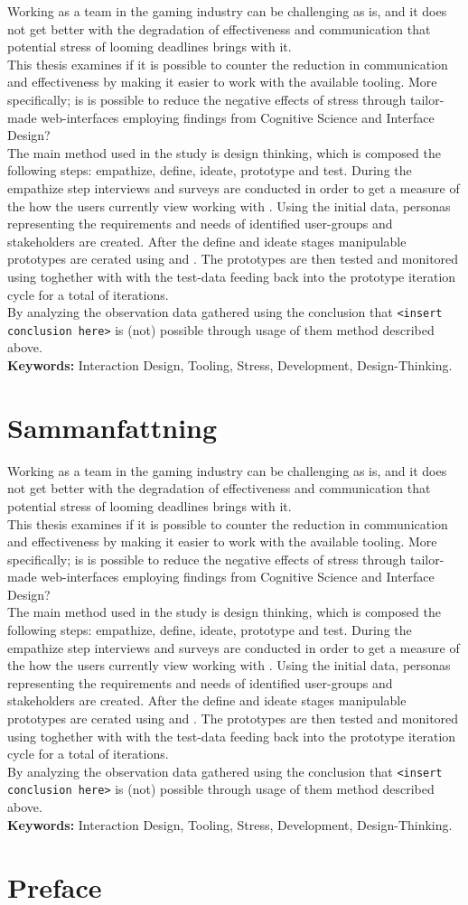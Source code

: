 \documentclass[a4paper,11pt]{article}
\begin{document}
\def\abs{
  Working as a team in the gaming industry can be challenging as is, and it
  does not get better with the degradation of effectiveness and communication
  that potential stress of looming deadlines brings with it. \\

  This thesis examines if it is possible to counter the reduction
  in communication and effectiveness by making it easier to work with the
  available tooling. More specifically; is is possible
  to reduce the negative effects of stress through tailor-made web-interfaces
  employing findings from Cognitive Science and Interface Design? \\

  The main method used in the study is design thinking, which is composed the
  following steps: empathize, define, ideate, prototype and test. During the
  empathize step interviews and surveys are conducted in order to get a measure
  of the how the users currently view working with {\shotgun}.
  Using the initial data, personas representing the requirements and needs of
  identified user-groups and stakeholders are created.
  After the define and ideate stages manipulable prototypes are cerated using
  {\python} and {\flask}. The prototypes are then tested and monitored using
  {\recordingSystem} toghether with {\reviewProtocol} with the test-data
  feeding back into the prototype iteration cycle for a total of {\numIterations}
  iterations. \\

  By analyzing the observation data gathered using {\recordingSystem} the
  conclusion that {\texttt{<insert conclusion here>}} is (not) possible through
  usage of them method described above. \\

  \textbf{Keywords:}
    Interaction Design,
    Tooling,
    Stress,
    Development,
    Design-Thinking.
}
{\abs}


\clearpage

\section*{Sammanfattning}

{\abs}

\clearpage

\section*{Preface}
\end{document}
